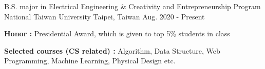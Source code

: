 
\begin{cventries}
  \cventry
    {B.S. major in Electrical Engineering \& Creativity and Entrepreneurship Program} %
    {National Taiwan University} %
    {Taipei, Taiwan} %
    {Aug. 2020 - Present} %
    {
      \begin{cvitems} %
         \item {\textbf{Honor :} Presidential Award, which is given to top 5\% students in class}
         \item {\textbf{Selected courses (CS related) :} Algorithm, Data Structure, Web Programming, Machine Learning, Physical Design etc.}
      \end{cvitems}
    }
\end{cventries}

